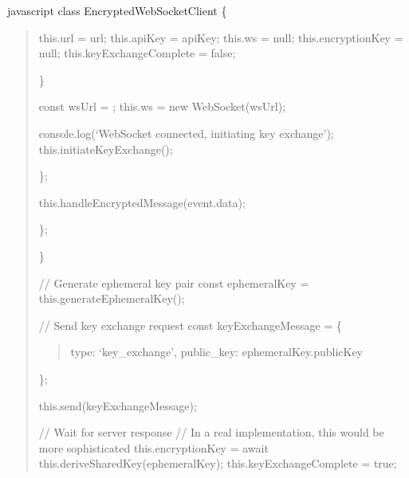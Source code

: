 \documentclass[letterpaper,10pt,english]{sphinxmanual}
\begin{document}
\sphinxAtStartPar
{\color{red}\bfseries{}\textasciigrave{}\textasciigrave{}}{\color{red}\bfseries{}\textasciigrave{}}javascript
class EncryptedWebSocketClient \{
\begin{quote}
\begin{description}
\sphinxAtStartPar
this.url = url;
this.apiKey = apiKey;
this.ws = null;
this.encryptionKey = null;
this.keyExchangeComplete = false;

\end{description}

\sphinxAtStartPar
\}
\begin{description}
\sphinxAtStartPar
const wsUrl = ;
this.ws = new WebSocket(wsUrl);
\begin{description}
\sphinxAtStartPar
console.log(‘WebSocket connected, initiating key exchange’);
this.initiateKeyExchange();

\end{description}

\sphinxAtStartPar
\};
\begin{description}
\sphinxAtStartPar
this.handleEncryptedMessage(event.data);

\end{description}

\sphinxAtStartPar
\};

\end{description}

\sphinxAtStartPar
\}
\begin{description}
\sphinxAtStartPar
// Generate ephemeral key pair
const ephemeralKey = this.generateEphemeralKey();

\sphinxAtStartPar
// Send key exchange request
const keyExchangeMessage = \{
\begin{quote}

\sphinxAtStartPar
type: ‘key\_exchange’,
public\_key: ephemeralKey.publicKey
\end{quote}

\sphinxAtStartPar
\};

\sphinxAtStartPar
this.send(keyExchangeMessage);

\sphinxAtStartPar
// Wait for server response
// In a real implementation, this would be more sophisticated
this.encryptionKey = await this.deriveSharedKey(ephemeralKey);
this.keyExchangeComplete = true;


\end{description}
\end{quote}
\end{document}
